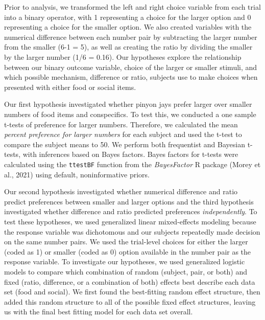 \documentclass[
  english,
  ,doc,floatsintext]{apa6}
\begin{document}
Prior to analysis, we transformed the left and right choice variable from each trial into a binary operator, with 1 representing a choice for the larger option and 0 representing a choice for the smaller option. We also created variables with the numerical difference between each number pair by subtracting the larger number from the smaller (6-1 = 5), as well as creating the ratio by dividing the smaller by the larger number (1/6 = 0.16). Our hypotheses explore the relationship between our binary outcome variable, choice of the larger or smaller stimuli, and which possible mechanism, difference or ratio, subjects use to make choices when presented with either food or social items.

Our first hypothesis investigated whether pinyon jays prefer larger over smaller numbers of food items and conspecifics. To test this, we conducted a one sample t-tests of preference for larger numbers. Therefore, we calculated the mean \emph{percent preference for larger numbers} for each subject and used the t-test to compare the subject means to 50. We perform both frequentist and Bayesian t-tests, with inferences based on Bayes factors. Bayes factors for t-tests were calculated using the \texttt{ttestBF} function from the \emph{BayesFactor} R package (Morey et al., 2021) using default, noninformative priors.

Our second hypothesis investigated whether numerical difference and ratio predict preferences between smaller and larger options and the third hypothesis investigated whether difference and ratio predicted preferences \emph{independently}. To test these hypotheses, we used generalized linear mixed-effects modeling because the response variable was dichotomous and our subjects repeatedly made decision on the same number pairs. We used the trial-level choices for either the larger (coded as 1) or smaller (coded as 0) option available in the number pair as the response variable. To investigate our hypotheses, we used generalized logistic models to compare which combination of random (subject, pair, or both) and fixed (ratio, difference, or a combination of both) effects best describe each data set (food and social). We first found the best-fitting random effect structure, then added this random structure to all of the possible fixed effect structures, leaving us with the final best fitting model for each data set overall.
\end{document}
